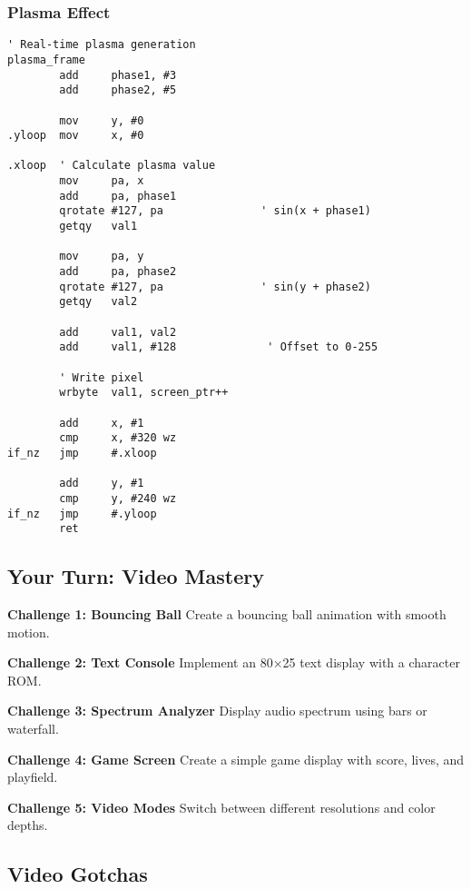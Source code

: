 \documentclass[11pt]{book}
\begin{document}
\hypertarget{plasma-effect}{%
\subsubsection{Plasma Effect}\label{plasma-effect}}

\begin{lstlisting}
' Real-time plasma generation
plasma_frame
        add     phase1, #3
        add     phase2, #5
        
        mov     y, #0
.yloop  mov     x, #0
        
.xloop  ' Calculate plasma value
        mov     pa, x
        add     pa, phase1
        qrotate #127, pa               ' sin(x + phase1)
        getqy   val1
        
        mov     pa, y
        add     pa, phase2
        qrotate #127, pa               ' sin(y + phase2)
        getqy   val2
        
        add     val1, val2
        add     val1, #128              ' Offset to 0-255
        
        ' Write pixel
        wrbyte  val1, screen_ptr++
        
        add     x, #1
        cmp     x, #320 wz
if_nz   jmp     #.xloop
        
        add     y, #1
        cmp     y, #240 wz
if_nz   jmp     #.yloop
        ret
\end{lstlisting}

\hypertarget{your-turn-video-mastery}{%
\subsection{Your Turn: Video Mastery}\label{your-turn-video-mastery}}

\begin{yourturn}
\textbf{Challenge 1: Bouncing Ball}
Create a bouncing ball animation with smooth motion.

\textbf{Challenge 2: Text Console}
Implement an 80×25 text display with a character ROM.

\textbf{Challenge 3: Spectrum Analyzer}
Display audio spectrum using bars or waterfall.

\textbf{Challenge 4: Game Screen}
Create a simple game display with score, lives, and playfield.

\textbf{Challenge 5: Video Modes}
Switch between different resolutions and color depths.
\end{yourturn}

\hypertarget{video-gotchas}{%
\subsection{Video Gotchas}\label{video-gotchas}}
\end{document}
